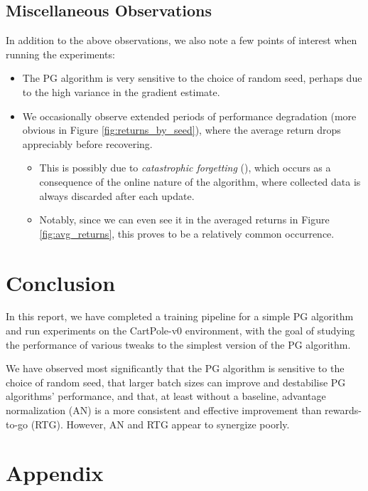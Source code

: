 \documentclass{article} %
\begin{document}
\subsection{Miscellaneous Observations}
In addition to the above observations, we also note a few points of interest when running the experiments:
\begin{itemize}
    \item The PG algorithm is very sensitive to the choice of random seed, perhaps due to 
    the high variance in the gradient estimate.
    \item We occasionally observe extended periods of 
        performance degradation (more obvious in Figure \ref{fig:returns_by_seed}), where the average return drops appreciably
        before recovering. 
        \begin{itemize}
            \item This is possibly due to \textit{catastrophic forgetting} (\cite{Goodfellow-et-al-2013}), which occurs as a consequence of the online nature of the algorithm,
            where collected data is always discarded after each update.
            \item Notably, since we can even see it in the averaged returns in Figure \ref{fig:avg_returns},
            this proves to be a relatively common occurrence.
        \end{itemize}
\end{itemize}

\section{Conclusion}
In this report, we have completed a training pipeline for a simple PG algorithm
and run experiments on the CartPole-v0 environment, with the goal of studying the performance 
of various tweaks to the simplest version of the PG algorithm. 

We have observed most significantly that the PG algorithm is sensitive to the choice of random seed,
that larger batch sizes can improve and destabilise PG algorithms' performance, 
and that, at least without a baseline, advantage normalization (AN) is a more 
consistent and effective improvement than rewards-to-go (RTG). 
However, AN and RTG appear to synergize poorly.




\appendix
\section*{Appendix}
\end{document}
